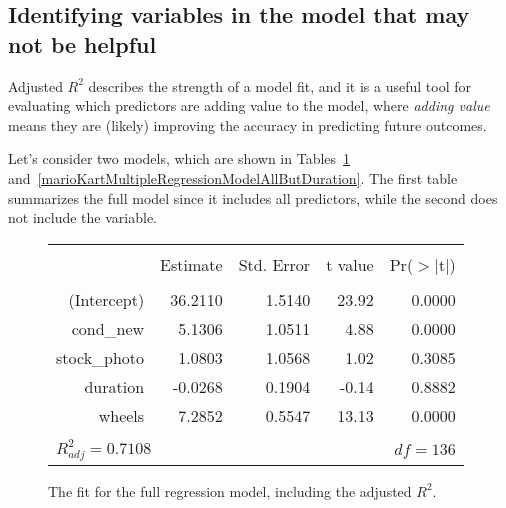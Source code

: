 \subsection{Identifying variables in the model that may not be helpful}

Adjusted $R^2$ describes the strength of a model fit, and it is a useful tool for evaluating which predictors are adding value to the model, where \emph{adding value} means they are (likely) improving the accuracy in predicting future outcomes.

Let's consider two models, which are shown in Tables~\ref{outputForMultipleRegrOutputForAllPredictors2} and~\ref{marioKartMultipleRegressionModelAllButDuration}. The first table summarizes the full model since it includes all predictors, while the second does not include the  variable.

\begin{figure}[ht]
\centering
\begin{tabular}{rrrrr}
  \hline
  \vspace{-3.7mm} & & & & \\
 & Estimate & Std. Error & t value & Pr($>$$|$t$|$) \\ 
  \hline
  \vspace{-3.8mm} & & & & \\
(Intercept) & 36.2110 & 1.5140 & 23.92 & 0.0000 \\ 
  cond\_\hspace{0.3mm}new & 5.1306 & 1.0511 & 4.88 & 0.0000 \\ 
  stock\_\hspace{0.3mm}photo & 1.0803 & 1.0568 & 1.02 & 0.3085 \\ 
  duration & -0.0268 & 0.1904 & -0.14 & 0.8882 \\ 
  wheels & 7.2852 & 0.5547 & 13.13 & 0.0000 \\ 
   \hline
  \vspace{-3.6mm} & & & & \\
\multicolumn{3}{l}{$R_{adj}^2 = 0.7108$}&\multicolumn{2}{r}{$df=136$}
\end{tabular}
\caption{The fit for the full regression model, including the adjusted $R^2$.}
\label{outputForMultipleRegrOutputForAllPredictors2}
\end{figure}


